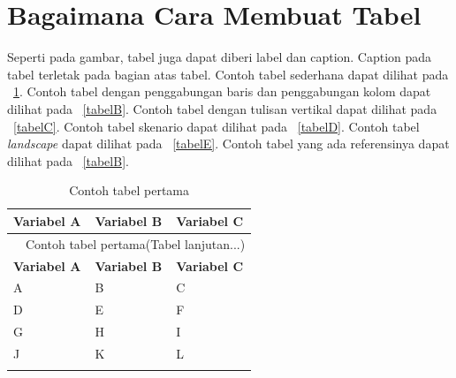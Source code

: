 \section{Bagaimana Cara Membuat Tabel}
Seperti pada gambar, tabel juga dapat diberi label dan caption. Caption pada tabel terletak pada bagian atas tabel. Contoh tabel sederhana dapat dilihat pada \tab~\ref{tabelA}. Contoh tabel dengan penggabungan baris dan penggabungan kolom dapat dilihat pada \tab~\ref{tabelB}. Contoh tabel dengan tulisan vertikal dapat dilihat pada \tab~\ref{tabelC}. Contoh tabel skenario dapat dilihat pada \tab~\ref{tabelD}. Contoh tabel \textit{landscape} dapat dilihat pada \tab~\ref{tabelE}. Contoh tabel yang ada referensinya dapat dilihat pada \tab~\ref{tabelB}.

\renewcommand\namaTabel{Contoh tabel pertama}
\begin{longtable}{p{3cm} p{3cm} p{3cm}}
	\caption{\namaTabel}\\
	\hline
	\textbf{Variabel A} & \textbf{Variabel B} & \textbf{Variabel C}\\
	\hline
	\endfirsthead

	\multicolumn{3}{c}{\tablename\ \thetable\ \namaTabel \space (Tabel lanjutan...)} \\
	\hline
	\textbf{Variabel A} & \textbf{Variabel B} & \textbf{Variabel C}\\
	\hline
	\endhead

	A & B & C\\
	D & E & F\\
	G & H & I\\
	J & K & L\\ \hline

\label{tabelA}
\end{longtable}


